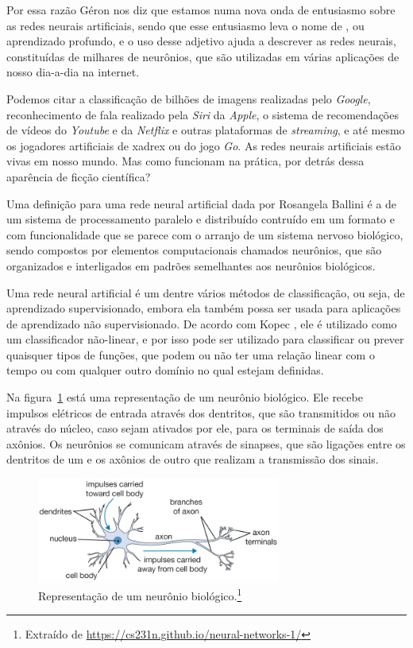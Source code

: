 Por essa razão Géron \citep{hands} nos diz que estamos numa nova onda de entusiasmo sobre as redes neurais artificiais, sendo que esse entusiasmo leva o nome de , ou aprendizado profundo, e o uso desse adjetivo ajuda a descrever as redes neurais, constituídas de milhares de neurônios, que são utilizadas em várias aplicações de nosso dia-a-dia na internet.

Podemos citar a classificação de bilhões de imagens realizadas pelo \emph{Google}, reconhecimento de fala realizado pela \emph{Siri} da \emph{Apple}, o sistema de recomendações de vídeos do \emph{Youtube} e da \emph{Netflix} e outras plataformas de \emph{streaming}, e até mesmo os jogadores artificiais de xadrex ou do jogo \emph{Go}. As redes neurais artificiais estão vivas em nosso mundo. Mas como funcionam na prática, por detrás dessa aparência de ficção científica?

Uma definição para uma rede neural artificial dada por Rosangela Ballini \citep{doutorado} é a de um sistema de processamento paralelo e distribuído contruído em um formato e com funcionalidade que se parece com o arranjo de um sistema nervoso biológico, sendo compostos por elementos computacionais chamados neurônios, que são organizados e interligados em padrões semelhantes aos neurônios biológicos.

Uma rede neural artificial é um dentre vários métodos de classificação, ou seja, de aprendizado supervisionado, embora ela também possa ser usada para aplicações de aprendizado não supervisionado. De acordo com Kopec \citep{classic}, ele é utilizado como um classificador não-linear, e por isso pode ser utilizado para classificar ou prever quaisquer tipos de funções, que podem ou não ter uma relação linear com o tempo ou com qualquer outro domínio no qual estejam definidas.

Na figura~\ref{fig:neuron} está uma representação de um neurônio biológico. Ele recebe impulsos elétricos de entrada através dos dentritos, que são transmitidos ou não através do núcleo, caso sejam ativados por ele, para os terminais de saída dos axônios. Os neurônios se comunicam através de sinapses, que são ligações entre os dentritos de um e os axônios de outro que realizam a transmissão dos sinais. 

\begin{figure}[htb]
\centering
\includegraphics[width=8cm]{figuras/neuron}
\caption{Representação de um neurônio biológico.\footnote{Extraído de \url{https://cs231n.github.io/neural-networks-1/}}}
\label{fig:neuron}
\end{figure}

